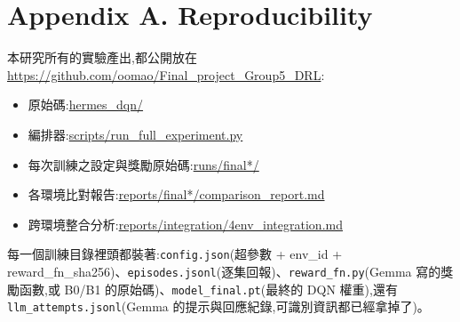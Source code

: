 \documentclass[conference,onecolumn,letterpaper,10pt]{IEEEtran}
\providecommand{\tightlist}{\setlength{\itemsep}{0pt}\setlength{\parskip}{0pt}}
\begin{document}
\section*{Appendix A. Reproducibility}

本研究所有的實驗產出,都公開放在 \url{https://github.com/oomao/Final_project_Group5_DRL}:

\begin{itemize}
\tightlist
\item
  原始碼:\url{hermes_dqn/}
\item
  編排器:\url{scripts/run_full_experiment.py}
\item
  每次訓練之設定與獎勵原始碼:\url{runs/final*/}
\item
  各環境比對報告:\url{reports/final*/comparison_report.md}
\item
  跨環境整合分析:\url{reports/integration/4env_integration.md}
\end{itemize}

每一個訓練目錄裡頭都裝著:\texttt{config.json}(超參數 + env\_id + reward\_fn\_sha256)、\texttt{episodes.jsonl}(逐集回報)、\texttt{reward\_fn.py}(Gemma 寫的獎勵函數,或 B0/B1 的原始碼)、\texttt{model\_final.pt}(最終的 DQN 權重),還有 \texttt{llm\_attempts.jsonl}(Gemma 的提示與回應紀錄,可識別資訊都已經拿掉了)。
\end{document}
